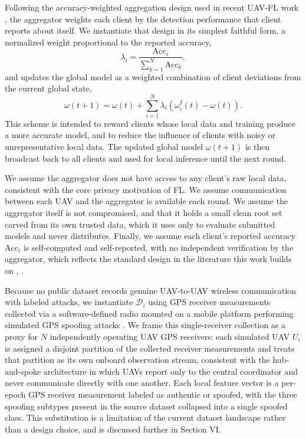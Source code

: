 \documentclass[journal]{IEEEtran}
\begin{document}
Following the accuracy-weighted aggregation design used in recent UAV-FL work \cite{chai2025navigation}, the aggregator weights each client by the detection performance that client reports about itself. We instantiate that design in its simplest faithful form, a normalized weight proportional to the reported accuracy,
\begin{equation}
\lambda_i = \frac{\mathrm{Acc}_i}{\sum_{k=1}^{N} \mathrm{Acc}_k},
\label{eq:weight}
\end{equation}
and updates the global model as a weighted combination of client deviations from the current global state,
\begin{equation}
\omega(t+1) = \omega(t) + \sum_{i=1}^{N} \lambda_i \left(\omega_i^{I}(t) - \omega(t)\right).
\label{eq:aggregation}
\end{equation}
This scheme is intended to reward clients whose local data and training produce a more accurate model, and to reduce the influence of clients with noisy or unrepresentative local data. The updated global model $\omega(t+1)$ is then broadcast back to all clients and used for local inference until the next round.

We assume the aggregator does not have access to any client's raw local data, consistent with the core privacy motivation of FL. We assume communication between each UAV and the aggregator is available each round. We assume the aggregator itself is not compromised, and that it holds a small clean root set carved from its own trusted data, which it uses only to evaluate submitted models and never distributes. Finally, we assume each client's reported accuracy $\mathrm{Acc}_i$ is self-computed and self-reported, with no independent verification by the aggregator, which reflects the standard design in the literature this work builds on \cite{chai2025navigation}, \cite{udin2025federated}.

Because no public dataset records genuine UAV-to-UAV wireless communication with labeled attacks, we instantiate $\mathcal{D}_i$ using GPS receiver measurements collected via a software-defined radio mounted on a mobile platform performing simulated GPS spoofing attacks \cite{aissou2022dataset}. We frame this single-receiver collection as a proxy for $N$ independently operating UAV GPS receivers: each simulated UAV $U_i$ is assigned a disjoint partition of the collected receiver measurements and treats that partition as its own onboard observation stream, consistent with the hub-and-spoke architecture in which UAVs report only to the central coordinator and never communicate directly with one another. Each local feature vector is a per-epoch GPS receiver measurement labeled as authentic or spoofed, with the three spoofing subtypes present in the source dataset collapsed into a single spoofed class. This substitution is a limitation of the current dataset landscape rather than a design choice, and is discussed further in Section VI.
\end{document}

